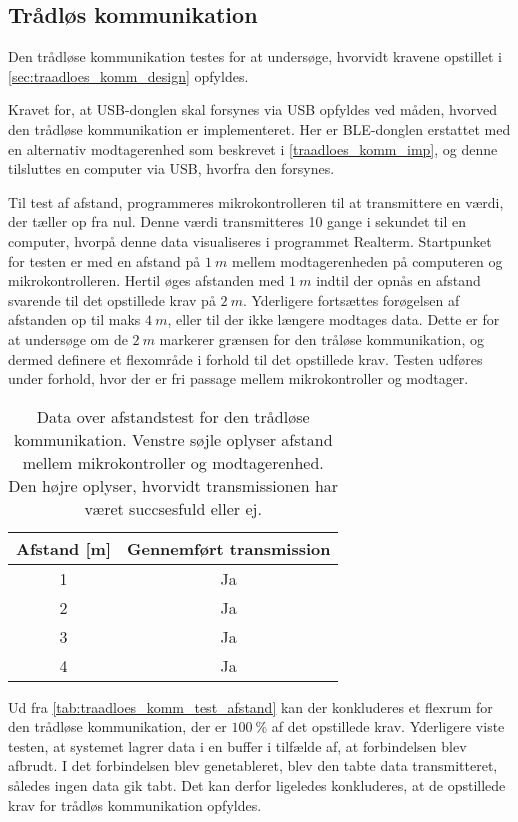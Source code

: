 \subsection{Trådløs kommunikation}
Den trådløse kommunikation testes for at undersøge, hvorvidt kravene opstillet i \autoref{sec:traadloes_komm_design} opfyldes. 

\noindent
Kravet for, at USB-donglen skal forsynes via USB opfyldes ved måden, hvorved den trådløse kommunikation er implementeret. Her er BLE-donglen erstattet med en alternativ modtagerenhed som beskrevet i \autoref{traadloes_komm_imp}, og denne tilsluttes en computer via USB, hvorfra den forsynes. 


\noindent
Til test af afstand, programmeres mikrokontrolleren til at transmittere en værdi, der tæller op fra nul. Denne værdi transmitteres 10 gange i sekundet til en computer, hvorpå denne data visualiseres i programmet Realterm.
Startpunket for testen er med en afstand på $1~m$ mellem modtagerenheden på computeren og mikrokontrolleren. 
Hertil øges afstanden med $1~m$ indtil der opnås en afstand svarende til det opstillede krav på $2~m$. Yderligere fortsættes forøgelsen af afstanden op til maks $4~m$, eller til der ikke længere modtages data. Dette er for at undersøge om de $2~m$ markerer grænsen for den tråløse kommunikation, og dermed definere et flexområde i forhold til det opstillede krav. Testen udføres under forhold, hvor der er fri passage mellem mikrokontroller og modtager.  

\begin{table}[H]
\centering
\begin{tabular}{|c|c|}
\hline 
Afstand [m] & Gennemført transmission \\ 
\hline 
1 & Ja \\ 
\hline 
2 & Ja \\ 
\hline 
3 & Ja \\ 
\hline 
4 & Ja \\ 
\hline 
\end{tabular} 
\caption{Data over afstandstest for den trådløse kommunikation. Venstre søjle oplyser afstand mellem mikrokontroller og modtagerenhed. Den højre oplyser, hvorvidt transmissionen har været succsesfuld eller ej.}
\label{tab:traadloes_komm_test_afstand}
\end{table}

Ud fra \autoref{tab:traadloes_komm_test_afstand} kan der konkluderes et flexrum for den trådløse kommunikation, der er $100~\%$ af det opstillede krav. Yderligere viste testen, at systemet lagrer data i en buffer i tilfælde af, at forbindelsen blev afbrudt. I det forbindelsen blev genetableret, blev den tabte data transmitteret, således ingen data gik tabt. Det kan derfor ligeledes konkluderes, at de opstillede krav for trådløs kommunikation opfyldes.

 